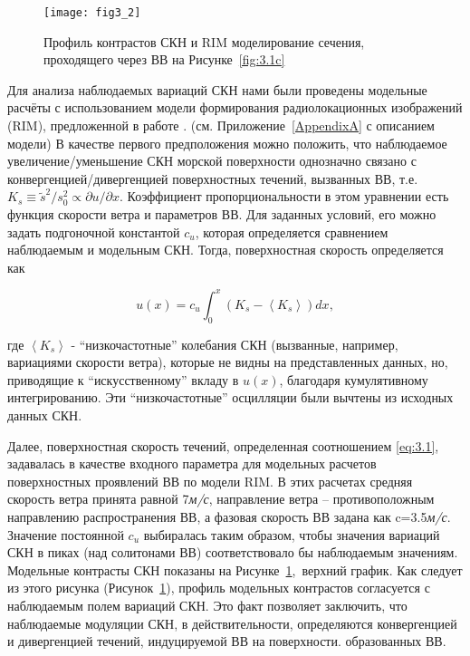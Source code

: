 \begin{figure}[H]
    \texttt{[image: fig3\_2]}
    \caption{Профиль контрастов СКН и RIM моделирование сечения, проходящего через ВВ на Рисунке~\ref{fig:3.1c}}
    \label{fig:3.2}
\end{figure}


Для анализа наблюдаемых вариаций СКН нами были проведены модельные расчёты с использованием модели формирования радиолокационных изображений (RIM), предложенной в работе \citep{Kudryavtsev2005}. (см. Приложение~\ref{AppendixA} с описанием модели) В качестве первого предположения можно положить, что наблюдаемое увеличение/уменьшение СКН морской поверхности однозначно связано с конвергенцией/дивергенцией поверхностных течений, вызванных ВВ, т.е. $K_{s} \equiv \tilde{s}^{2} /s_{0}^{2} \propto \partial u/\partial x$. Коэффициент пропорциональности в этом уравнении есть функция скорости ветра и параметров ВВ. Для заданных условий, его можно задать подгоночной константой $c_{u} $, которая определяется сравнением наблюдаемым и модельным СКН. Тогда, поверхностная скорость определяется как



\begin{equation} \label{eq:3.1} u(x)=c_{u} \int _{0}^{x}\left(K_{s} -\left\langle K_{s} \right\rangle \right)dx ,  \end{equation} 



\noindent где $\left\langle K_{s} \right\rangle $ - ``низкочастотные'' колебания СКН (вызванные, например, вариациями скорости ветра), которые не видны на представленных данных, но, приводящие к ``искусственному'' вкладу в $u(x)$, благодаря кумулятивному интегрированию. Эти ``низкочастотные'' осцилляции были вычтены из исходных данных СКН.

Далее, поверхностная скорость течений, определенная соотношением \eqref{eq:3.1}, задавалась в качестве входного параметра для модельных расчетов поверхностных проявлений ВВ по модели RIM. В этих расчетах средняя скорость ветра принята равной 7\textit{м/с}, направление ветра -- противоположным направлению распространения ВВ, а фазовая скорость ВВ задана как c=3.5\textit{м/с}. Значение постоянной $c_{u} $ выбиралась таким образом, чтобы значения вариаций СКН в пиках (над солитонами ВВ) соответствовало бы наблюдаемым значениям. Модельные контрасты СКН показаны на Рисунке~\ref{fig:3.2},~верхний график. Как следует из этого рисунка (Рисунок~\ref{fig:3.2}), профиль модельных контрастов согласуется с наблюдаемым полем вариаций СКН. Это факт позволяет заключить, что наблюдаемые модуляции СКН, в действительности, определяются конвергенцией и дивергенцией течений, индуцируемой ВВ на поверхности. образованных ВВ.

